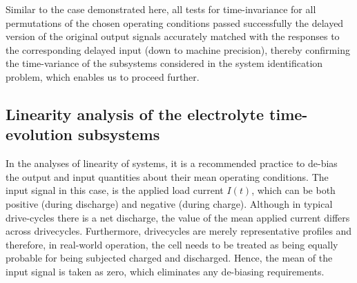 Similar to  the case demonstrated  here, all  tests for time-invariance  for all
permutations of  the chosen operating  conditions passed successfully  \ie{} the
delayed  version of  the original  output  signals accurately  matched with  the
responses  to  the corresponding  delayed  input  (down to  machine  precision),
thereby confirming the time-variance of  the subsystems considered in the system
identification problem, which enables us to proceed further.


\subsection{Linearity analysis of the electrolyte time-evolution subsystems}\label{subsec:linearityanalysis}

In the analyses of linearity of systems, it is a recommended practice to de-bias
the output and input quantities about their mean operating conditions. The input
signal in  this case,  is the  applied load  current $I(t)$,  which can  be both
positive (during  discharge) and negative  (during charge). Although  in typical
drive-cycles there  is a net  discharge, the value  of the mean  applied current
differs across  drivecycles. Furthermore, drivecycles are  merely representative
profiles and therefore, in real-world operation, the cell needs to be treated as
being equally  probable for being  subjected charged and discharged.  Hence, the
mean  of the  input signal  is taken  as zero,  which eliminates  any de-biasing
requirements.


